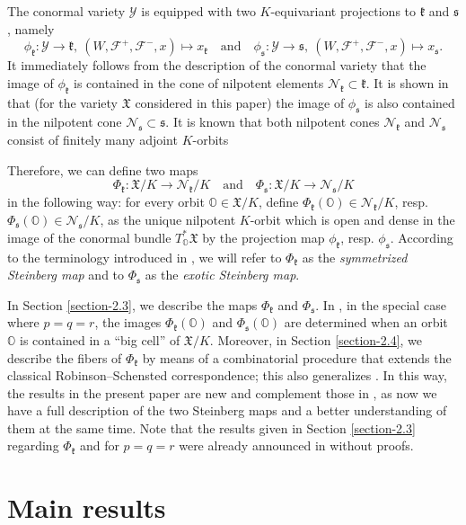 \documentclass[ALCO,Unicode]{cedram}
\newcommand{\fk}{\mathfrak{k}}
\newcommand{\fs}{\mathfrak{s}}
\newcommand{\flag}{\mathcal{F}}
\newcommand{\conormal}{\mathcal{Y}}
\newcommand{\Xorbit}{\mathbb{O}}
\newcommand{\nilpotentsof}[1]{\mathcal{N}_{#1}}
\newcommand{\Xfv}{\mathfrak{X}}
\begin{document}
The conormal variety $\conormal$ is equipped with two $K$-equivariant projections to $\fk$ and $\fs$, namely
\[\phi_\fk:\conormal\to\fk,\ (W,\flag^+,\flag^-,x)\mapsto x_\fk\quad\mbox{and}\quad
\phi_\fs:\conormal\to\fs,\ (W,\flag^+,\flag^-,x)\mapsto x_\fs.\]
It immediately follows from the description of the conormal variety that the image of $\phi_\fk$ is contained in the cone of nilpotent elements $\nilpotentsof{\fk}\subset\fk$.
It is shown in \cite[Proposition 4.2]{FN1} that (for the variety $\Xfv$ considered in this paper) the image of $\phi_\fs$ is also contained in the nilpotent cone $\nilpotentsof{\fs}\subset\fs$.
It is known that both nilpotent cones $\nilpotentsof{\fk}$ and $\nilpotentsof{\fs}$ consist of finitely many adjoint $K$-orbits

Therefore, we can define two maps
\[\Phi_\fk:\Xfv/K\to\nilpotentsof{\fk}/K
\quad\mbox{and}\quad
\Phi_\fs:\Xfv/K\to\nilpotentsof{\fs}/K\]
in the following way: for every orbit $\Xorbit\in\Xfv/K$, define $\Phi_\fk(\Xorbit)\in \nilpotentsof{\fk}/K$, resp. $\Phi_\fs(\Xorbit)\in\nilpotentsof{\fs}/K$, as the unique nilpotent $K$-orbit which is open and dense in the image of the conormal bundle $T^*_\Xorbit\Xfv$ by the projection map $\phi_\fk$, resp. $\phi_\fs$. According to the terminology introduced in \cite{FN2}, we will refer to $\Phi_\fk$ as the {\em symmetrized Steinberg map} and to $\Phi_\fs$ as the {\em exotic Steinberg map}.

In Section \ref{section-2.3}, we describe the maps $\Phi_\fk$ and $\Phi_\fs$. In \cite{FN2}, in the special case where $p=q=r$,
the images $\Phi_\fk(\Xorbit)$ and $\Phi_\fs(\Xorbit)$ are determined when an orbit $\Xorbit$ is contained in a ``big cell'' of $\Xfv/K$.
Moreover, in Section \ref{section-2.4}, we describe the fibers of $\Phi_\fk$ by means of a combinatorial procedure that extends the classical Robinson--Schensted correspondence; this also generalizes \cite[Theorem 7.8]{FN2}.
In this way, the results in the present paper are new and complement those in \cite{FN2}, as now we have a full description of the two Steinberg maps and a better understanding of them at the same time. Note that the results given in Section \ref{section-2.3} regarding $\Phi_\fk$ and for $p=q=r$ were already announced in \cite[\S 2]{FN3} without proofs.




\section{Main results}
\end{document}
